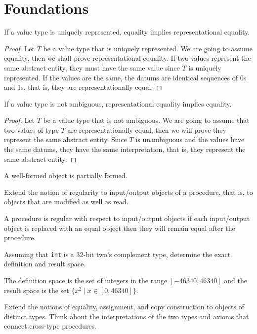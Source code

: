 
\chapter{Foundations}

\begin{lemma}
	If a value type is uniquely represented, equality implies representational equality.
\end{lemma}

\begin{proof}
	Let $T$ be a value type that is uniquely represented. We are going to assume equality,
	then we shall prove representational equality. If two values represent the same abstract entity,
	they must have the same value since $T$ is uniquely represented. If the values are the same, the datums
	are identical sequences of 0s and 1s, that is, they are representationally equal.
\end{proof}

\begin{lemma}
	If a value type is not ambiguous, representational equality implies equality.
\end{lemma}

\begin{proof}
	Let $T$ be a value type that is not ambiguous. We are going to assume that two values of type $T$ are
	representationally equal, then we will prove they represent the same abstract entity. Since $T$ is
	unambiguous and the values have the same datums, they have the same interpretation, that is, they
	represent the same abstract entity.
\end{proof}

\begin{lemma}
	A well-formed object is partially formed.
\end{lemma}

\begin{exercise}
	Extend the notion of regularity to input/output objects of a procedure, that is, to objects that are
	modified as well as read.
\end{exercise}

\begin{solution}
	A procedure is regular with respect to input/output objects if each input/output object is replaced
	with an equal object then they will remain equal after the procedure.
\end{solution}

\begin{exercise}
	Assuming that \verb|int| is a 32-bit two's complement type, determine the exact definition and result space.
\end{exercise}

\begin{solution}
	The definition space is the set of integers in the range $[-46340, 46340]$ and the result space is
	the set $\{ x^2 \mid x \in [0, 46340] \}$.
\end{solution}

\begin{project}
	Extend the notions of equality, assignment, and copy construction to objects of distinct types. Think
	about the interpretations of the two types and axioms that connect cross-type procedures.
\end{project}
